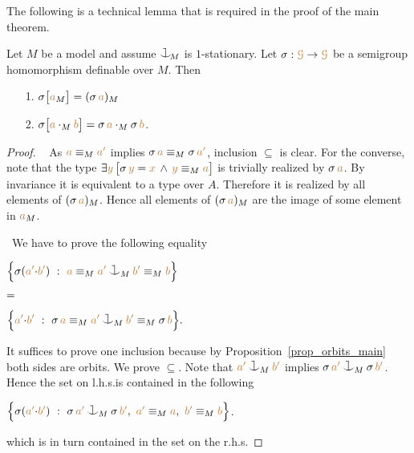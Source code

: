 \documentclass[creche.tex]{subfiles}
\begin{document}
The following is a technical lemma that is required in the proof of the main theorem.

\begin{proposition}\label{prop_HJ_tecnical}
Let $M$ be a model and assume $\cnonfork_{\!M}$ is $1$-stationary.
Let $\sigma:{\color{brown}\EuScript G}\to{\color{brown}\EuScript G}$ be a semigroup homomorphism definable over $M$.
Then 
\begin{itemize}
\item[1.] $\sigma\big[{\color{brown} a}_M\big]=(\sigma\,{\color{brown} a})_M$

\item[2.]
$\sigma\big[{\color{brown} a}\cdot_M{\color{brown} b}\big]=\sigma\,{\color{brown} a}\cdot_M\sigma\,{\color{brown} b}$.
\end{itemize}
\end{proposition}
\begin{proof}\   
As ${\color{brown} a}\equiv_M{\color{brown} a'}$ implies $\sigma\,{\color{brown} a}\equiv_M\sigma\,{\color{brown} a'}$,
inclusion $\subseteq$ is clear.
For the converse, note that the type 
$\exists{\color{brown}y}\,\big[\sigma\,{\color{brown} y}={\color{brown} x}\,\wedge\,{\color{brown} y}\equiv_M{\color{brown} a}\big]$ 
is trivially realized by $\sigma\,{\color{brown} a}$.
By invariance it is equivalent to a type over $A$.
Therefore it is realized by all elements of $(\sigma\,{\color{brown} a})_M$.
Hence all elements of $(\sigma\,{\color{brown} a})_M$ are the image of some element in ${\color{brown} a}_M$.

\def\medrel#1{\parbox[t]{6ex}{$\displaystyle\hfil #1$}}
\def\ceq#1#2#3{\parbox[t]{39ex}{$\displaystyle #1$}\medrel{#2}{$\displaystyle #3$}}
 \  
We have to prove the following equality\smallskip

\ceq{\hfill\Big\{\sigma({\mr a'}{\cdot}{\mr b'})\ :\ {\mr a}\equiv_M{\mr a'}\cnonfork_M{\mr b'}\equiv_M{\mr b} \Big\}}
{=}
{\Big\{{\mr a'}{\cdot}{\mr b'}\ :\ \sigma\,{\mr a}\equiv_M{\mr a'}\cnonfork_M{\mr b'}\equiv_M\sigma\,{\mr b} \Big\}.}\smallskip

It suffices to prove one inclusion because by Proposition~\ref{prop_orbits_main} both sides are orbits.
We prove $\subseteq$.
Note that ${\mr a'}\cnonfork_M{\mr b'}$ implies $\sigma\,{\mr a'}\cnonfork_M\sigma\,{\mr b'}$.
Hence the set on l.h.s.\@ is contained in the following\smallskip

\hfil$\Big\{\sigma({\mr a'}{\cdot}{\mr b'})\ :\ \sigma\,{\mr a'}\cnonfork_M\sigma\,{\mr b'},\ {\mr a'}\equiv_M{\mr a},\  {\mr b'}\equiv_M{\mr b} \Big\}$.\smallskip

which is in turn contained in the set on the r.h.s.
\end{proof}

\end{document}
